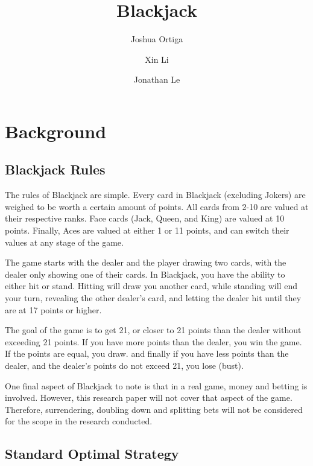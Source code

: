 \documentclass{article}
\title{Blackjack}
\author{Joshua Ortiga \\
\and
Xin Li \\
\and
Jonathan Le}
\begin{document}
\maketitle

\setlength{\parskip}{\baselineskip}%
\newpage

{\parindent0pt %

\section{Background}
\label{sec: Background}

	\subsection{Blackjack Rules}
	\label{sec: Blackjack Rules}

		The rules of Blackjack are simple. Every card in Blackjack (excluding Jokers) are weighed to be worth a certain
		amount of points. All cards from 2-10 are valued at their respective ranks. Face cards (Jack, Queen, and King) 
		are valued at 10 points. Finally, Aces are valued at either 1 or 11 points, and can switch their values at
		any stage of the game. 

		The game starts with the dealer and the player drawing two cards, with the dealer only showing one of their cards.
		In Blackjack, you have the ability to either hit or stand. Hitting will draw you another card, while standing will 
		end your turn, revealing the other dealer's card, and letting the dealer hit until they are at 17 points or higher.

		The goal of the game is to get 21, or closer to 21 points than the dealer without exceeding 21 points. If you have more points than the dealer,
		you win the game. If the points are equal, you draw.
		and finally if you have less points than the dealer, and the dealer's points do not exceed 21, you lose (bust).

		One final aspect of Blackjack to note is that in a real game, money and betting is involved. However, this research paper
		will not cover that aspect of the game. Therefore, surrendering, doubling down and splitting bets will not be considered
		for the scope in the research conducted.

	\subsection{Standard Optimal Strategy}
	\label{sec: Optimal Strategy}

}
\end{document}
